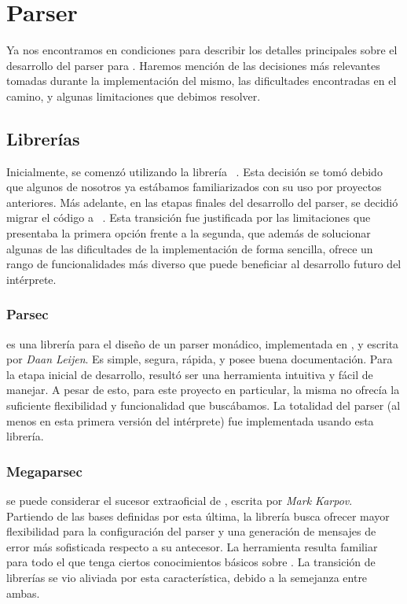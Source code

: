 \section{Parser}

Ya nos encontramos en condiciones para describir los detalles principales sobre el desarrollo del parser para \Lenguaje{}.
Haremos mención de las decisiones más relevantes tomadas durante la implementación del mismo, las dificultades encontradas en el camino, y algunas limitaciones que debimos resolver.

\subsection{Librerías}

Inicialmente, se comenzó utilizando la librería \Parsec{}~\cite{Parsec}.
Esta decisión se tomó debido que algunos de nosotros ya estábamos familiarizados con su uso por proyectos anteriores.
Más adelante, en las etapas finales del desarrollo del parser, se decidió migrar el código a \Megaparsec{}~\cite{Megaparsec}.
Esta transición fue justificada por las limitaciones que presentaba la primera opción frente a la segunda, que además de solucionar algunas de las dificultades de la implementación de forma sencilla, ofrece un rango de funcionalidades más diverso que puede beneficiar al desarrollo futuro del intérprete.

\subsubsection{Parsec}

\Parsec{} es una librería para el diseño de un parser monádico, implementada en \Haskell{}, y escrita por \textit{Daan Leijen}.
Es simple, segura, rápida, y posee buena documentación.
Para la etapa inicial de desarrollo, resultó ser una herramienta intuitiva y fácil de manejar.
A pesar de esto, para este proyecto en particular, la misma no ofrecía la suficiente flexibilidad y funcionalidad que buscábamos.
La totalidad del parser (al menos en esta primera versión del intérprete) fue implementada usando esta librería.

\subsubsection{Megaparsec}

\Megaparsec{} se puede considerar el sucesor extraoficial de \Parsec{}, escrita por \textit{Mark Karpov}.
Partiendo de las bases definidas por esta última, la librería busca ofrecer mayor flexibilidad para la configuración del parser y una generación de mensajes de error más sofisticada respecto a su antecesor.
La herramienta resulta familiar para todo el que tenga ciertos conocimientos básicos sobre \Parsec{}.
La transición de librerías se vio aliviada por esta característica, debido a la semejanza entre ambas.


